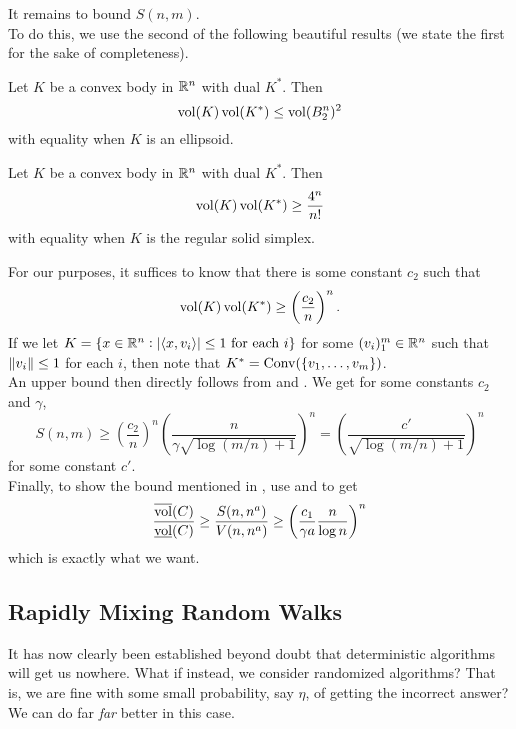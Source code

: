 It remains to bound $S(n,m)$.\\

To do this, we use the second of the following beautiful results (we state the first for the sake of completeness).

\begin{theorem}
\label{santalo inequality}
Let $K$ be a convex body in $\mathbb{R}^n$ with dual $K^*$. Then
\[ \operatorname{vol}(K)\operatorname{vol}(K^*) \leq \operatorname{vol}(B_2^n)^2 \]
with equality when $K$ is an ellipsoid.
\end{theorem}

\begin{ftheo}
\label{inverse santalo inequality}
Let $K$ be a convex body in $\mathbb{R}^n$ with dual $K^*$. Then
\[ \operatorname{vol}(K)\operatorname{vol}(K^*) \geq \frac{4^n}{n!} \]
with equality when $K$ is the regular solid simplex.
\end{ftheo}

For our purposes, it suffices to know that there is some constant $c_2$ such that
\[ \operatorname{vol}(K)\operatorname{vol}(K^*) \geq \left(\frac{c_2}{n}\right)^n. \]
If we let $K=\{x\in\mathbb{R}^n:|\langle x,v_i\rangle| \leq 1\text{ for each $i$}\}$ for some $(v_i)_1^m\in\mathbb{R}^n$ such that $\left\lVert v_i\right\rVert\leq 1$ for each $i$, then note that $K^* = \operatorname{Conv}(\{v_1,\ldots,v_m\})$.\\
An upper bound then directly follows from  and . We get for some constants $c_2$ and $\gamma$,
\begin{equation}
\label{eqn: lower bound on S n m}
	S(n,m) \geq \left(\frac{c_2}{n}\right)^n \left(\frac{n}{\gamma\sqrt{ \log(m/n)+1}}\right)^n = \left(\frac{c'}{\sqrt{\log(m/n)+1}}\right)^n
\end{equation}
for some constant $c'$.\\

Finally, to show the bound mentioned in , use  and  to get
\[ \frac{\overline{\operatorname{vol}}(C)}{\underline{\operatorname{vol}}(C)} \geq \frac{S(n,n^a)}{V(n,n^a)} \geq \left(\frac{c_1}{\gamma a}\frac{n}{\log n}\right)^n \]
which is exactly what we want.

\subsection{Rapidly Mixing Random Walks}

It has now clearly been established beyond doubt that deterministic algorithms will get us nowhere. What if instead, we consider randomized algorithms? That is, we are fine with some small probability, say $\eta$, of getting the incorrect answer? We can do far \textit{far} better in this case.

